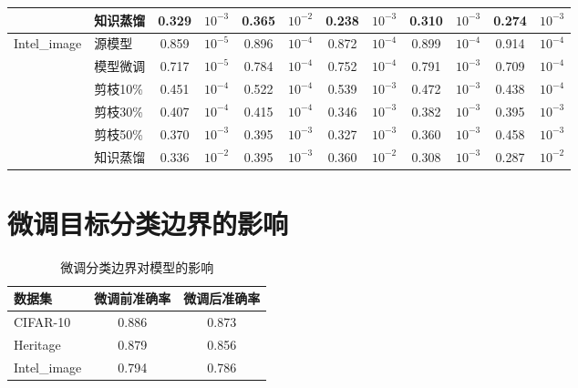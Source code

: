 \begin{table}[H]
{\begin{tabular}{l l c c c c c c c c c c}
								&知识蒸馏  & 0.329 & $10^{-3}$ & 0.365 & $10^{-2}$ & 0.238 & $10^{-3}$ & 0.310 & $10^{-3}$ & 0.274 & $10^{-3}$   \\
		\hline
\multirow{6}{5em}{Intel\_image} &源模型    & 0.859 & $10^{-5}$ & 0.896 & $10^{-4}$ & 0.872 & $10^{-4}$ & 0.899 & $10^{-4}$ & 0.914 & $10^{-4}$   \\
								&模型微调  & 0.717 & $10^{-5}$ & 0.784 & $10^{-4}$ & 0.752 & $10^{-4}$ & 0.791 & $10^{-3}$ & 0.709 & $10^{-4}$   \\
								&剪枝10\%  & 0.451 & $10^{-4}$ & 0.522 & $10^{-4}$ & 0.539 & $10^{-3}$ & 0.472 & $10^{-3}$ & 0.438 & $10^{-4}$   \\
								&剪枝30\%  & 0.407 & $10^{-4}$ & 0.415 & $10^{-4}$ & 0.346 & $10^{-3}$ & 0.382 & $10^{-3}$ & 0.395 & $10^{-3}$   \\
								&剪枝50\%  & 0.370 & $10^{-3}$ & 0.395 & $10^{-3}$ & 0.327 & $10^{-3}$ & 0.360 & $10^{-3}$ & 0.458 & $10^{-3}$   \\
								&知识蒸馏  & 0.336 & $10^{-2}$ & 0.395 & $10^{-3}$ & 0.360 & $10^{-2}$ & 0.308 & $10^{-3}$ & 0.287 & $10^{-2}$   \\
		\hline		
	\end{tabular}
}
\end{table}



\section{微调目标分类边界的影响}\label{5.5}

\begin{table}[H]
	\centering
	\setlength{\arrayrulewidth}{0.5mm}
	\renewcommand\arraystretch{1.8}
	\caption{微调分类边界对模型的影响}
	\label{table:state}
	\begin{tabular*}{13cm}{@{\extracolsep{\fill}} l c c}
		
	\hline
	数据集        &    微调前准确率   &   微调后准确率            \\
	\hline
	CIFAR-10      &     0.886        &     0.873               \\
	
	Heritage      &     0.879        &     0.856               \\
	
	Intel\_image  &     0.794        &     0.786               \\
	\hline		
	\end{tabular*}
\end{table}


